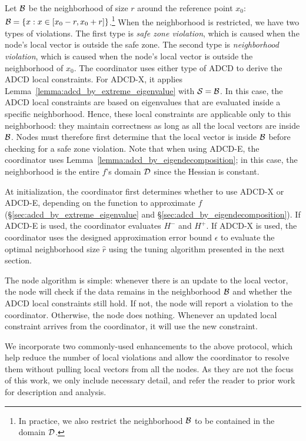 Let $\mathcal{B}$ be the neighborhood of size $r$ around the reference point $x_0$: $\mathcal{B} = \{ x : x \in [x_0-r,x_0+r] \}$.\footnote{In practice, we also restrict the neighborhood $\mathcal{B}$ to be contained in the domain $\mathcal{D}$.}
When the neighborhood is restricted, we have two types of violations.
The first type is \emph{safe zone violation}, which is caused when the node's local vector is outside the safe zone.
The second type is \emph{neighborhood violation}, which is caused when the node's local vector is outside the neighborhood of $x_0$.
The coordinator uses either type of ADCD to derive the ADCD local constraints.
For ADCD-X, it applies Lemma~\ref{lemma:adcd_by_extreme_eigenvalue} with $\mathcal{S}=\mathcal{B}$.
In this case, the ADCD local constraints are based on eigenvalues that are evaluated inside a specific neighborhood.
Hence, these local constraints are applicable only to this neighborhood:
they maintain correctness as long as all the local vectors are inside $\mathcal{B}$.
Nodes must therefore first determine that the local vector is inside $\mathcal{B}$ before checking for a safe zone violation.
Note that when using ADCD-E, the coordinator uses Lemma~\ref{lemma:adcd_by_eigendecomposition}; in this case, the neighborhood is the entire $f$'s domain $\mathcal{D}$ since the Hessian is constant. 

At initialization, the coordinator first determines whether to use ADCD-X or ADCD-E, depending on the function to approximate $f$ (\S\ref{sec:adcd_by_extreme_eigenvalue} and \S\ref{sec:adcd_by_eigendecomposition}).
If ADCD-E is used, the coordinator evaluates $H^-$ and $H^+$.
If ADCD-X is used, the coordinator uses the designed approximation error bound $\epsilon$ to evaluate the optimal neighborhood size $\hat{r}$ using the tuning algorithm presented in the next section.


The node algorithm is simple: whenever there is an update to the local vector, the node will check if the data remains in the neighborhood $\mathcal{B}$ and whether the ADCD local constraints still hold.
If not, the node will report a violation to the coordinator.
Otherwise, the node does nothing.
Whenever an updated local constraint arrives from the coordinator, it will use the new constraint.


We incorporate two commonly-used enhancements to the above protocol, which help reduce the number of local violations and allow the coordinator to resolve them without pulling local vectors from all the nodes.
As they are not the focus of this work, we only include necessary detail, and refer the reader to prior work~\cite[Sec.~4.2 and~4.6]{gabel:entropy_approximation} for description and analysis.

